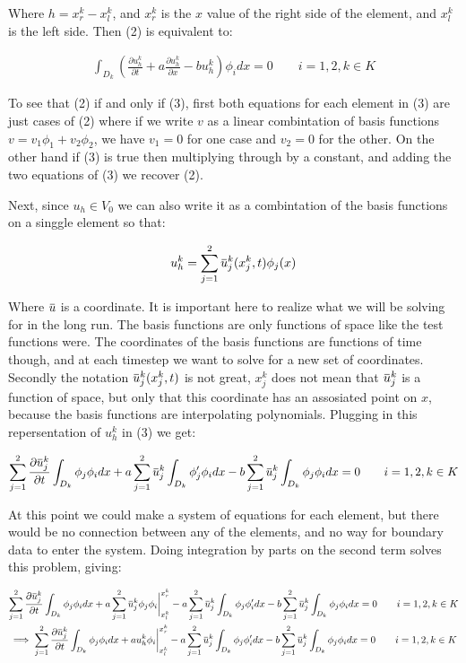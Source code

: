 \documentclass{article}
\newcommand{\overbar}[1]{\mkern 1.5mu\overline{\mkern-1.5mu#1\mkern-1.5mu}\mkern 1.5mu}
\begin{document}
Where $ h = x_r^k - x_l^k$, and $x_r^k$ is the $x$ value of the right side of the element, and $x_l^k$ is the left side.  Then (2) is equivalent to:

\begin{gather}
\int_{D_k} \left(\frac{\partial u_h^k}{\partial t} + a \frac{\partial u_h^k}{\partial x} - bu_h^k\right) \phi_i dx = 0 \qquad i = 1,2,  k \in K
\end{gather}

To see that (2) if and only if (3), first both equations for each element in (3) are just cases of (2) where if we write $v$ as a linear combintation of basis functions $v = v_1\phi_1 + v_2\phi_2$, we have $v_1 = 0$ for one case and $v_2 = 0$ for the other. On the other hand if (3) is true then multiplying through by a constant, and adding the two equations of (3) we recover (2).


Next, since $u_h \in V_0$ we can also write it as a combintation of the basis functions on a singgle element so that:


$$u^k_h = \sum_{j=1}^2 \overbar{u}^k_j(x_j^k, t)\phi_j(x)$$

\noindent Where $\overbar{u}$ is a coordinate. It is important here to realize what we will be solving for in the long run. The basis functions are only functions of space like the test functions were. The coordinates of the basis functions are functions of time though, and at each timestep we want to solve for a new set of coordinates. Secondly the notation $ \overbar{u}^k_j(x_j^k, t)$ is not great, $x^k_j$ does not mean that $\overbar{u}^k_j$ is a function of space, but only that this coordinate has an assosiated point on $x$, because the basis functions are interpolating polynomials. Plugging in this repersentation of $u_h^k$ in (3) we get:

\begin{gather*}
 \sum_{j=1}^2 \frac{\partial\overbar{u}^k_j}{\partial t}\int_{D_k}\phi_j\phi_i dx + a\sum_{j=1}^2 \overbar{u}^k_j\int_{D_k} \phi_j^{\prime} \phi_i dx - b  \sum_{j=1}^2 \overbar{u}^k_j\int_{D_k}\phi_j \phi_i dx = 0 \qquad i = 1,2,  k \in K
\end{gather*}

At this point we could make a system of equations for each element, but there would be no connection between any of the elements, and no way for boundary data to enter the system. Doing integration by parts on the second term solves this problem, giving:

\begin{gather*}
  \sum_{j=1}^2 \frac{\partial\overbar{u}^k_j}{\partial t}\int_{D_k}\phi_j\phi_i dx + a\sum_{j=1}^2 \overbar{u}^k_j \phi_j \phi_i\biggr\rvert_{x_l^k}^{x_r^k}  - a\sum_{j=1}^2 \overbar{u}^k_j\int_{D_k} \phi_j \phi_i^{\prime} dx - b  \sum_{j=1}^2 \overbar{u}^k_j\int_{D_k}\phi_j \phi_i dx = 0 \qquad i = 1,2,  k \in K\\
\implies   \sum_{j=1}^2 \frac{\partial\overbar{u}^k_j}{\partial t}\int_{D_k}\phi_j\phi_i dx + au^k_h\phi_i\biggr\rvert_{x_l^k}^{x_r^k}  - a\sum_{j=1}^2 \overbar{u}^k_j\int_{D_k} \phi_j \phi_i^{\prime} dx - b  \sum_{j=1}^2 \overbar{u}^k_j\int_{D_k}\phi_j \phi_i dx = 0 \qquad i = 1,2,  k \in K\\
\end{gather*}
\end{document}
